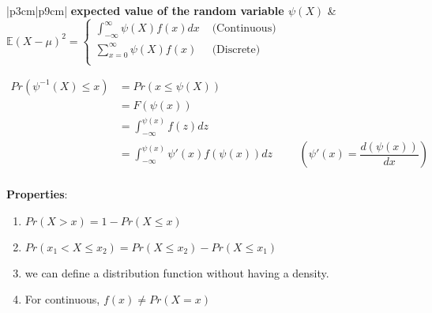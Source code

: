 \begin{longtable}{|p{3cm}|p{9cm}|}
    \textbf{expected value of the random variable $\psi(X)$} &
    \vspace{0.1cm} \(
        \mathbb{E}(X-\mu)^2 =
        \begin{cases}
            \displaystyle\int_{-\infty}^\infty \psi(X) f(x)dx &
            \text{ (Continuous)}\\[2ex]
            \displaystyle\sum_{x=0}^\infty \psi(X) f(x) &
            \text{ (Discrete)}\\
        \end{cases}
    \) \vspace{0.1cm} \\
    \hline

\end{longtable}

\begin{align*}
    Pr(\psi^{-1}(X) \leq x) 
    &= Pr(x\leq\psi(X)) \\
    &= F(\psi(x)) \\
    &= \displaystyle\int_{-\infty}^{\psi(x)} f(z)dz\\
    &= \displaystyle\int_{-\infty}^{\psi(x)} \psi'(x) f(\psi(x))dz &&& \left( \psi'(x) = \dfrac{d(\psi(x))}{dx} \right)\\
\end{align*}

\textbf{Properties}:
\begin{enumerate}
    \item $Pr(X > x) = 1 - Pr(X \leq x)$

    \item $Pr(x_1 < X \leq x_2) = Pr(X \leq x_2) - Pr(X \leq x_1)$

    \item we can define a distribution function without having a density. 

    \item For continuous, $f(x) \neq Pr(X = x)$

\end{enumerate}



































